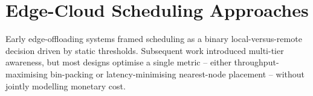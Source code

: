 \section{Edge-Cloud Scheduling Approaches}
Early edge-offloading systems framed scheduling as a binary local-versus-remote decision driven by static thresholds. Subsequent work introduced multi-tier awareness, but most designs optimise a single metric -- either throughput-maximising bin-packing or latency-minimising nearest-node placement -- without jointly modelling monetary cost.
